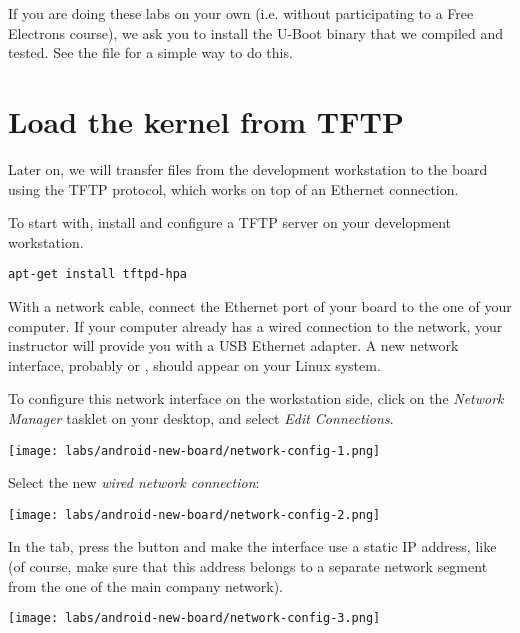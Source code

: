 If you are doing these labs on your own (i.e. without participating to a
Free Electrons course), we ask you to install the U-Boot binary
that we compiled and tested. See the
file for a simple way to do this.

\section{Load the kernel from TFTP}

Later on, we will transfer files from the development workstation to
the board using the TFTP protocol, which works on top of an Ethernet
connection.

To start with, install and configure a TFTP server on your development
workstation.

\begin{verbatim}
apt-get install tftpd-hpa
\end{verbatim}

With a network cable, connect the Ethernet port of your board to the
one of your computer. If your computer already has a wired connection
to the network, your instructor will provide you with a USB Ethernet
adapter. A new network interface, probably  or ,
should appear on your Linux system.

To configure this network interface on the workstation side, click on
the {\em Network Manager} tasklet on your desktop, and select {\em
  Edit Connections}.

\begin{center}
\texttt{[image: labs/android-new-board/network-config-1.png]}
\end{center}

Select the new {\em wired network connection}:

\begin{center}
\texttt{[image: labs/android-new-board/network-config-2.png]}
\end{center}

In the  tab, press the  button
and make the interface use a static IP
address, like  (of course, make sure that this
address belongs to a separate network segment from the one of the main
company network).

\begin{center}
\texttt{[image: labs/android-new-board/network-config-3.png]}
\end{center}

